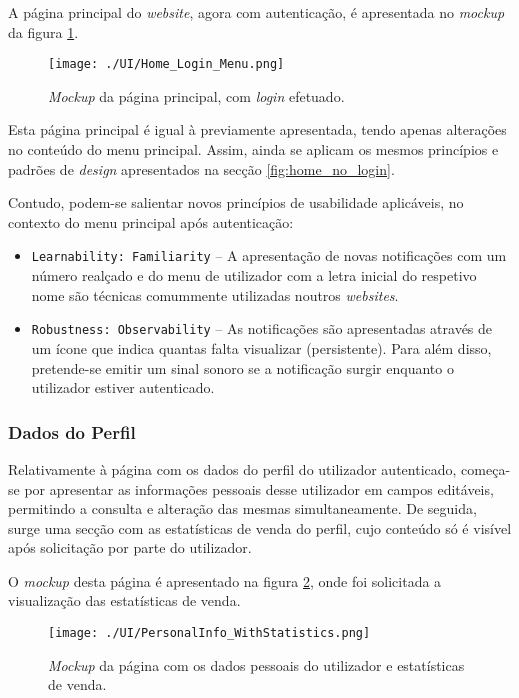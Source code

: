 A página principal do \textit{website}, agora com autenticação, é apresentada no \textit{mockup} da figura \ref{fig:home_with_login}.

\begin{figure}[H]
    \centering
    \texttt{[image: ./UI/Home\_Login\_Menu.png]}
    \caption{\textit{Mockup} da página principal, com \textit{login} efetuado.}
    \label{fig:home_with_login}
\end{figure}

Esta página principal é igual à previamente apresentada, tendo apenas alterações no conteúdo do menu principal. Assim, ainda se aplicam os mesmos princípios e padrões de \textit{design} apresentados na secção \ref{fig:home_no_login}.

Contudo, podem-se salientar novos princípios de usabilidade aplicáveis, no contexto do menu principal após autenticação:

\begin{itemize}
    \item \texttt{Learnability: Familiarity} -- A apresentação de novas notificações com um número realçado e do menu de utilizador com a letra inicial do respetivo nome são técnicas comummente utilizadas noutros \textit{websites}.
    
    \item \texttt{Robustness: Observability} -- As notificações são apresentadas através de um ícone que indica quantas falta visualizar (persistente). Para além disso, pretende-se emitir um sinal sonoro se a notificação surgir enquanto o utilizador estiver autenticado.
\end{itemize}


\subsubsection{Dados do Perfil}

Relativamente à página com os dados do perfil do utilizador autenticado, começa-se por apresentar as informações pessoais desse utilizador em campos editáveis, permitindo a consulta e alteração das mesmas simultaneamente. De seguida, surge uma secção com as estatísticas de venda do perfil, cujo conteúdo só é visível após solicitação por parte do utilizador.

O \textit{mockup} desta página é apresentado na figura \ref{fig:personal_info_and_statistics}, onde foi solicitada a visualização das estatísticas de venda.

\begin{figure}[H]
    \centering
    \texttt{[image: ./UI/PersonalInfo\_WithStatistics.png]}
    \caption{\textit{Mockup} da página com os dados pessoais do utilizador e estatísticas de venda.}
    \label{fig:personal_info_and_statistics}
\end{figure}

